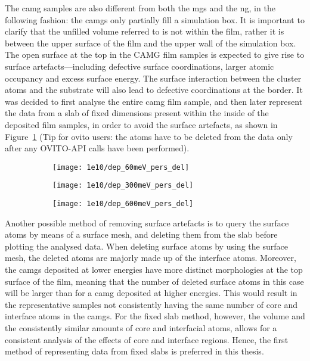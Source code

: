 \begin{changebar}
The \gls{camg} samples are also different from both the \gls{mg}s and the \gls{ng}, in the following fashion: the \gls{camg}s only partially fill a simulation box. It is important to clarify that the unfilled volume referred to is not within the film, rather it is between the upper surface of the film and the upper wall of the simulation box.  The open surface at the top in the CAMG film samples is expected to give rise to surface artefacts—including defective surface coordinations, larger atomic occupancy and excess surface energy. The surface interaction between the cluster atoms and the substrate will also lead to defective coordinations at the border. It was decided to first analyse the entire \gls{camg} film sample, and then later represent the data from a slab of fixed dimensions present within the inside of the deposited film samples, in order to avoid the surface artefacts, as shown in Figure~\ref{f:camg_slabs} (Tip for \gls{ovito} users: the atoms have to be deleted from the data only after any OVITO-API calls have been performed).  \par

\begin{figure}[h]
	\begin{subfigure}[b]{0.33\textwidth} \texttt{[image: 1e10/dep\_60meV\_pers\_del]}
		\caption{}
	\end{subfigure}%
	\hfill
	\begin{subfigure}[b]{0.33\textwidth} \texttt{[image: 1e10/dep\_300meV\_pers\_del]}
		\caption{}
	\end{subfigure}%
	\hfill
	\begin{subfigure}[b]{0.33\textwidth} \texttt{[image: 1e10/dep\_600meV\_pers\_del]}
		\caption{}
	\end{subfigure}%
	\label{f:camg_slabs}
\end{figure}
\end{changebar}

Another possible method of removing surface artefacts is to query the surface atoms by means of a surface mesh, and deleting them from the slab before plotting the analysed data. When deleting surface atoms by using the surface mesh, the deleted atoms are majorly made up of the interface atoms. Moreover, the \gls{camg}s deposited at lower energies have more distinct morphologies at the top surface of the film, meaning that the number of deleted surface atoms in this case will be larger than for a \gls{camg} deposited at higher energies. This would result in the representative samples not consistently having the same number of core and interface atoms in the \gls{camg}s. For the fixed slab method, however, the volume and the consistently similar amounts of core and interfacial atoms, allows for a consistent analysis of the effects of core and interface regions. Hence, the first method of representing data from fixed slabs is preferred in this thesis. \par

